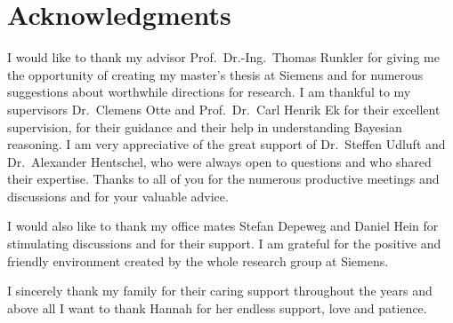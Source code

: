 \chapter{Acknowledgments}
I would like to thank my advisor Prof.\ Dr.-Ing.\ Thomas Runkler for giving me the opportunity of creating my master's thesis at Siemens and for numerous suggestions about worthwhile directions for research.
I am thankful to my supervisors Dr.\ Clemens Otte and Prof.\ Dr.\ Carl Henrik Ek for their excellent supervision, for their guidance and their help in understanding Bayesian reasoning.
I am very appreciative of the great support of Dr.\ Steffen Udluft and Dr.\ Alexander Hentschel, who were always open to questions and who shared their expertise.
Thanks to all of you for the numerous productive meetings and discussions and for your valuable advice.

I would also like to thank my office mates Stefan Depeweg and Daniel Hein for stimulating discussions and for their support.
I am grateful for the positive and friendly environment created by the whole research group at Siemens.

I sincerely thank my family for their caring support throughout the years and above all I want to thank Hannah for her endless support, love and patience.
